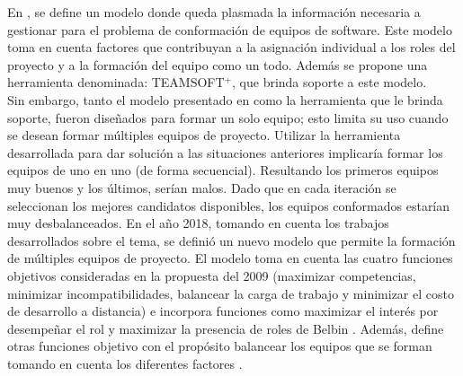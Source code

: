 En \cite{Mayi09}, se define un modelo donde queda plasmada la información necesaria a gestionar para el problema de conformación de equipos de software. Este modelo toma en cuenta factores que contribuyan a la asignación individual a los roles del proyecto y a la formación del equipo como un todo. Además se propone una herramienta denominada: TEAMSOFT$^+$, que brinda soporte a este modelo.\\

Sin embargo, tanto el modelo presentado en \cite{Mayi09} como la herramienta que le brinda soporte, fueron diseñados para formar un solo equipo; esto limita su uso cuando se desean formar múltiples equipos de proyecto. Utilizar la herramienta desarrollada para dar solución a las situaciones anteriores implicaría formar los equipos de uno en uno (de forma secuencial). Resultando los primeros equipos muy buenos y los últimos, serían malos. Dado que en cada iteración se seleccionan los mejores candidatos disponibles, los equipos conformados estarían muy desbalanceados. En el año 2018, tomando en cuenta los trabajos desarrollados sobre el tema, se definió un nuevo modelo que permite la formación de múltiples equipos de proyecto. El modelo toma en cuenta las cuatro funciones objetivos consideradas en la propuesta del 2009 \cite{Mayi09} (maximizar competencias, minimizar incompatibilidades, balancear la carga de trabajo y minimizar el costo de desarrollo a distancia) e incorpora funciones como maximizar el interés por desempeñar el rol y maximizar la presencia de roles de Belbin \cite{Mayi09}. Además, define otras funciones objetivo con el propósito balancear los equipos que se forman tomando en cuenta los diferentes factores \cite{Duran2019}.\\

